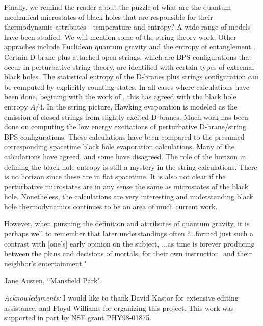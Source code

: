 \documentclass[12pt]{article}
\begin{document}
Finally, we remind the reader about the puzzle of what are the quantum
mechanical
microstates of black holes that are responsible for their thermodynamic
attributes -
temperature and entropy? A wide range of models have been studied. We will
mention some of
the string theory work. Other appraches include Euclidean quantum gravity
\cite{gh}
 and the entropy of entanglement \cite{bombelli}.
Certain D-brane plus attached open
strings, which are BPS configurations that occur in perturbative string
theory, are
identified with certain types of extremal black holes. The statistical
entropy of
the D-branes plus strings configuration can be computed by explicitly
counting states. In all
cases  where calculations have been done, begining with the work of
\cite{stromvafa}, this has
agreed with the black hole entropy  $A/4$. In the string
picture, Hawking evaporation is modeled as the emission of closed strings
from slightly excited D-branes.  Much work has been
done on computing the low energy excitations of perturbative
D-brane/string BPS configurations. These calculations have been compared
to the presumed corresponding spacetime  black hole evaporation calculations.
Many of the calculations have agreed, and some have
disagreed.
The role of the horizon in defining the black hole entropy is still
a mystery in the string calculations. There is no horizon since these are in
flat spacetime. It is also not clear if the perturbative microstates are in any
sense the same as microstates of the black hole. Nonetheless,
the calculations are very interesting and
understanding black hole thermodynamics continues to be an
area of much current work.

However, when pursuing the definition and attributes of quantum gravity, it is
perhaps well to remember that later understandings often ``...formed just
such  a
contrast with [one's] early opinion on the subject, ...as time is forever
producing
between the plans and decisions of mortals, for their own instruction, and
their neighbor's entertainment." \begin{footnote}{Jane Austen, ``Mansfield
Park".}\end{footnote}%

\vskip 0.1in\noindent
{\it Acknowledgments:}
\vskip 0.05in
I would like to thank David Kastor for extensive editing assistance, and Floyd
Williams for organizing this project. This work was supported in part by
NSF grant
PHY98-01875.
\end{document}
